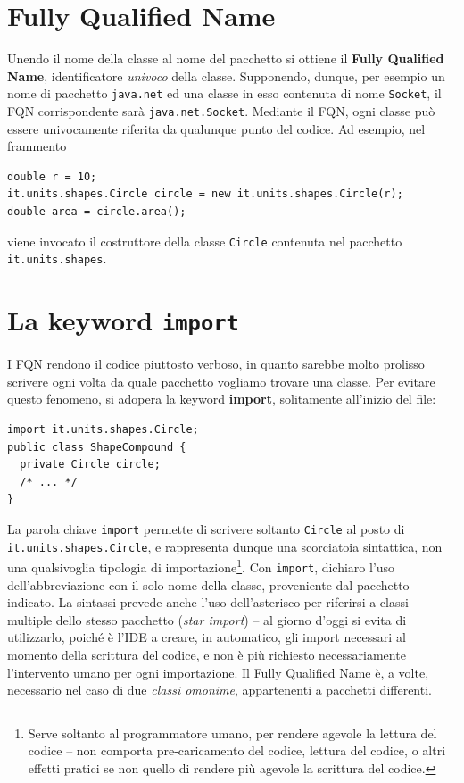 \documentclass[\fontsizeclass,twocolumn]{\classname}
\let\oldtextsc\textsc
\renewcommand{\textsc}[1]{\oldtextsc{\scfontfs #1}}
\theoremstyle{definition}
\theoremstyle{definition}
\begin{document}
\section{Fully Qualified Name}

Unendo il nome della classe al nome del pacchetto si ottiene il \textbf{Fully Qualified Name}, identificatore \emph{univoco} della classe. Supponendo, dunque, per esempio un nome di pacchetto \texttt{java.net} ed una classe in esso contenuta di nome \texttt{Socket}, il FQN corrispondente sarà \texttt{java.net.Socket}. Mediante il FQN, ogni classe può essere univocamente riferita da qualunque punto del codice. Ad esempio, nel frammento

\begin{lstlisting}
double r = 10;
it.units.shapes.Circle circle = new it.units.shapes.Circle(r);
double area = circle.area();
\end{lstlisting}

viene invocato il costruttore della classe \texttt{Circle} contenuta nel
pacchetto \texttt{it.units.shapes}.

\section{La keyword \texttt{import}}

I FQN rendono il codice piuttosto verboso, in quanto sarebbe molto prolisso
scrivere ogni volta da quale pacchetto vogliamo trovare una classe. Per evitare
questo fenomeno, si adopera la keyword \textbf{import}, solitamente all'inizio
del file:

\begin{lstlisting}
import it.units.shapes.Circle;
public class ShapeCompound {
  private Circle circle;
  /* ... */
}
\end{lstlisting}

La parola chiave \texttt{import} permette di scrivere soltanto \texttt{Circle}
al posto di \texttt{it.units.shapes.Circle}, e rappresenta dunque una
scorciatoia sintattica, non una qualsivoglia tipologia di
importazione\footnote{Serve soltanto al programmatore umano, per rendere
agevole la lettura del codice \--- non comporta pre-caricamento del
codice, lettura del codice, o altri effetti pratici se non quello di rendere
più agevole la scrittura del codice.}. Con \texttt{import}, dichiaro l'uso
dell'abbreviazione con il solo nome della classe, proveniente dal pacchetto
indicato. La sintassi prevede anche l'uso dell'asterisco per riferirsi a classi
multiple dello stesso pacchetto (\emph{star import}) \--- al giorno d'oggi si
evita di utilizzarlo, poiché è l'\textsc{IDE} a creare, in automatico, gli import
necessari al momento della scrittura del codice, e non è più richiesto
necessariamente l'intervento umano per ogni importazione. Il Fully Qualified
Name è, a volte, necessario nel caso di due \emph{classi omonime}, appartenenti
a pacchetti differenti.
\end{document}
